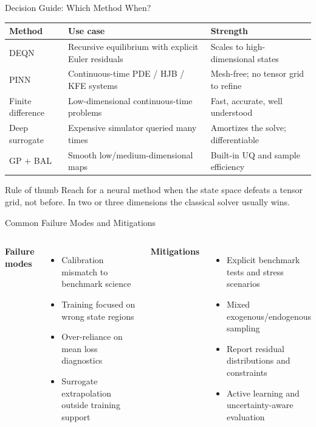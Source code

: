 \documentclass[aspectratio=169,11pt]{beamer}
\begin{document}
\begin{frame}{Decision Guide: Which Method When?}
\scriptsize
\begin{center}
\begin{tabular}{p{}p{}p{}}
\toprule
\textbf{Method} & \textbf{Use case} & \textbf{Strength} \\
\midrule
DEQN & Recursive equilibrium with explicit Euler residuals & Scales to high-dimensional states \\
PINN & Continuous-time PDE / HJB / KFE systems & Mesh-free; no tensor grid to refine \\
Finite difference & Low-dimensional continuous-time problems & Fast, accurate, well understood \\
Deep surrogate & Expensive simulator queried many times & Amortizes the solve; differentiable \\
GP $+$ BAL & Smooth low/medium-dimensional maps & Built-in UQ and sample efficiency \\
\bottomrule
\end{tabular}
\end{center}

\vspace{0.2cm}
\begin{block}{Rule of thumb}
Reach for a neural method when the state space defeats a tensor grid,
not before. In two or three dimensions the classical solver usually wins.
\end{block}
\end{frame}
\begin{frame}{Common Failure Modes and Mitigations}
\small
\begin{columns}[T]
\textbf{Failure modes}
\begin{itemize}
    \item Calibration mismatch to benchmark science
    \item Training focused on wrong state regions
    \item Over-reliance on mean loss diagnostics
    \item Surrogate extrapolation outside training support
\end{itemize}

\textbf{Mitigations}
\begin{itemize}
    \item Explicit benchmark tests and stress scenarios
    \item Mixed exogenous/endogenous sampling
    \item Report residual distributions and constraints
    \item Active learning and uncertainty-aware evaluation
\end{itemize}
\end{columns}
\end{frame}
\end{document}
